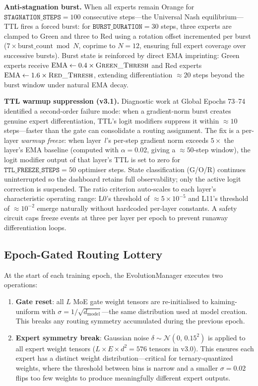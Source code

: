 \documentclass[11pt,a4paper]{article}
\begin{document}
\textbf{Anti-stagnation burst.}
When all experts remain Orange for $\texttt{STAGNATION\_STEPS} = 100$ consecutive
steps---the Universal Nash equilibrium---TTL fires a forced burst: for
$\texttt{BURST\_DURATION} = 30$ steps, three experts are clamped to Green and three
to Red using a rotation offset incremented per burst ($7 \times \text{burst\_count}
\bmod N$, coprime to $N\!=\!12$, ensuring full expert coverage over successive
bursts). Burst state is reinforced by direct EMA imprinting:
Green experts receive $\text{EMA} \leftarrow 0.4 \times \textsc{Green\_Thresh}$
and Red experts $\text{EMA} \leftarrow 1.6 \times \textsc{Red\_Thresh}$,
extending differentiation $\approx 20$ steps beyond the burst window under natural
EMA decay.

\textbf{TTL warmup suppression (v3.1).}
Diagnostic work at Global Epochs 73--74 identified a second-order failure mode:
when a gradient-norm burst creates genuine expert differentiation, TTL's logit
modifiers suppress it within $\approx 10$ steps---faster than the gate can
consolidate a routing assignment.  The fix is a per-layer \emph{warmup freeze}:
when layer~$l$'s per-step gradient norm exceeds $5\times$ the layer's EMA baseline
(computed with $\alpha\!=\!0.02$, giving a $\approx\!50$-step window), the logit
modifier output of that layer's TTL is set to zero for
$\texttt{TTL\_FREEZE\_STEPS}\!=\!50$ optimiser steps.  State classification (G/O/R)
continues uninterrupted so the dashboard retains full observability; only the active
logit correction is suspended.  The ratio criterion auto-scales to each layer's
characteristic operating range: L0's threshold of $\approx\!5 \times 10^{-5}$ and
L11's threshold of $\approx\!10^{-2}$ emerge naturally without hardcoded per-layer
constants.  A safety circuit caps freeze events at three per layer per epoch to
prevent runaway differentiation loops.

\subsection{Epoch-Gated Routing Lottery}
\label{subsec:routing_lottery}

At the start of each training epoch, the EvolutionManager executes two operations:

\begin{enumerate}
  \item \textbf{Gate reset}: all $L$ MoE gate weight tensors are re-initialised to
        kaiming-uniform with $\sigma = 1/\sqrt{d_\text{model}}$---the same
        distribution used at model creation. This breaks any routing symmetry
        accumulated during the previous epoch.
  \item \textbf{Expert symmetry break}: Gaussian noise
        $\delta \sim \mathcal{N}(0,\, 0.15^2)$ is applied to all expert
        weight tensors ($L \times E \times d^2 = 576$ tensors in v3.0). This
        ensures each expert has a distinct weight distribution---critical for
        ternary-quantized weights, where the threshold between bins is narrow and
        a smaller $\sigma\!=\!0.02$ flips too few weights to produce meaningfully
        different expert outputs.
\end{enumerate}
\end{document}

